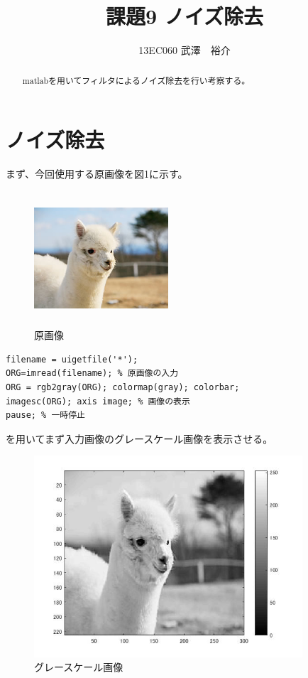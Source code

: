 \documentclass{jsarticle}
\begin{document}
\title{課題9 ノイズ除去}
\author{13EC060 武澤　裕介}
\maketitle
\begin{abstract}
matlabを用いてフィルタによるノイズ除去を行い考察する。
\end{abstract}
\section{ノイズ除去}
まず、今回使用する原画像を図1に示す。


\begin{figure}[htbp]
 \begin{center}
  \includegraphics[width=5cm,height=5cm]{a.jpg}
 \end{center}
 \caption{原画像}
\end{figure}

\begin{lstlisting}[basicstyle=\ttfamily\footnotesize, frame=single]
filename = uigetfile('*');
ORG=imread(filename); % 原画像の入力
ORG = rgb2gray(ORG); colormap(gray); colorbar;
imagesc(ORG); axis image; % 画像の表示
pause; % 一時停止
 \end{lstlisting}
を用いてまず入力画像のグレースケール画像を表示させる。

\newpage
\begin{figure}[htbp]
 \begin{center}
  \includegraphics[width=10cm]{8-0.jpg}
 \end{center}
 \caption{グレースケール画像}
\end{figure}
\end{document}
